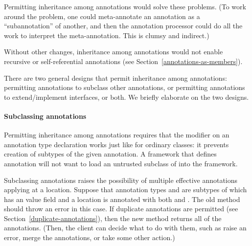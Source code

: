 \documentclass[10pt]{article}
\begin{document}
Permitting inheritance among annotations would solve these problems.  (To
work around the problem, one could meta-annotate an annotation as a
``subannotation'' of another, and then the annotation processor could do
all the work to interpret the meta-annotation.  This is clumsy and
indirect.)


Without other changes, inheritance among annotations would not enable
recursive or self-referential annotations (see
Section~\ref{annotations-as-members}).

There are two general designs that permit inheritance among annotations:
permitting annotations to subclass other annotations, or permitting
annotations to extend/implement interfaces, or both.
We briefly elaborate on the two designs.

\paragraph{Subclassing annotations}

Permitting inheritance among annotations requires that the 
modifier on an annotation type declaration works just like for ordinary
classes:  it prevents creation of subtypes of the given annotation.  A
framework that defines annotation  will not want to load an
untrusted subclass  of  into the framework.


Subclassing annotations raises the possibility of multiple effective
annotations applying at a location.
Suppose that annotation types
 and  are subtypes of  which has an
 value field and a location is annotated with both
 and .
The old  method should throw an error in this case.
If duplicate annotations are permitted (see
Section~\ref{duplicate-annotations}), then
the new  method returns all of the annotations.
(Then, the client can decide what to do with them, such as raise an
error, merge the annotations, or take some other action.)
\end{document}

